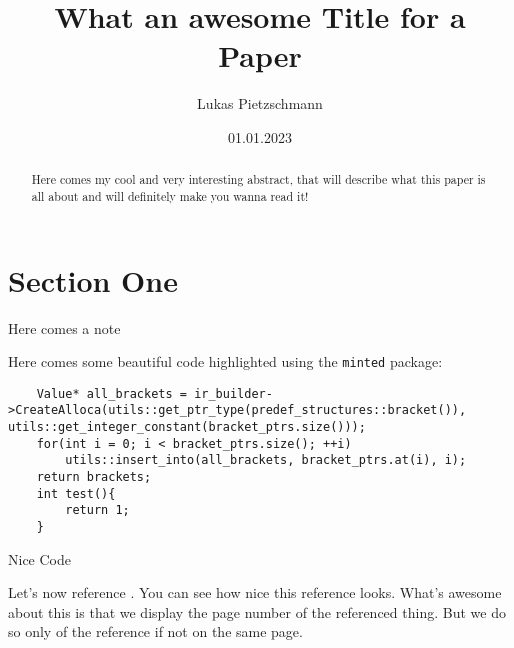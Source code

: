 \documentclass[english, sidenote]{article}
\title{What an awesome Title for a Paper}
\author{Lukas Pietzschmann}
\date{01.01.2023}
\begin{document}
\maketitle

\begin{abstract}
	Here comes my cool and very interesting abstract, that will describe what this paper is all about
	and will definitely make you wanna read it!
	\lipsum[2-3]
\end{abstract}

\tableofcontents

\emptypage
\setcounter{page}{1}

\section{Section One}

\lipsum[1-3]
Here comes a note
\lipsum[1]
\par
Here comes some beautiful code highlighted using the \texttt{minted} package:
\begin{listing}[H]
\begin{verbatim}
	Value* all_brackets = ir_builder->CreateAlloca(utils::get_ptr_type(predef_structures::bracket()), utils::get_integer_constant(bracket_ptrs.size()));
	for(int i = 0; i < bracket_ptrs.size(); ++i)
		utils::insert_into(all_brackets, bracket_ptrs.at(i), i);
	return brackets;
	int test(){
		return 1;
	}
\end{verbatim}
\caption{Nice Code}
\label{lst:test}
\end{listing}
\lipsum[1-4]\par
Let's now reference . You can see how nice this reference looks. What's awesome about this is that we display the page
number of the referenced thing. But we do so only of the reference if not on the same page.

\begin{appendix}
\listoflistings
\end{appendix}
\end{document}
